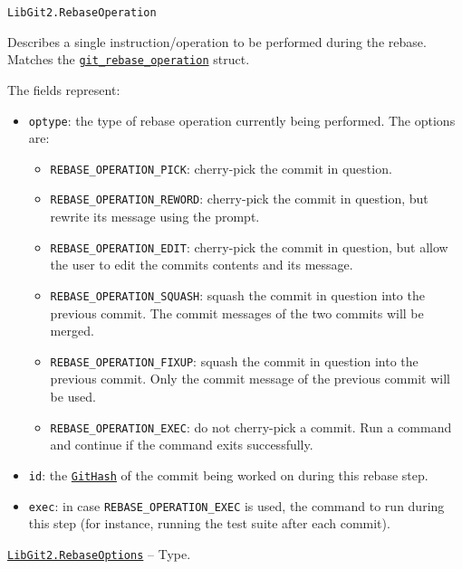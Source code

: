 \begin{adjustwidth}{2em}{0pt}


\begin{verbatim}
LibGit2.RebaseOperation
\end{verbatim}

Describes a single instruction/operation to be performed during the rebase. Matches the \href{https://libgit2.org/libgit2/\#HEAD/type/git\_rebase\_operation\_t}{\texttt{git\_rebase\_operation}} struct.

The fields represent:

\begin{itemize}
\item \texttt{optype}: the type of rebase operation currently being performed. The options are:

\begin{itemize}
\item \texttt{REBASE\_OPERATION\_PICK}: cherry-pick the commit in question.


\item \texttt{REBASE\_OPERATION\_REWORD}: cherry-pick the commit in question, but rewrite its message using the prompt.


\item \texttt{REBASE\_OPERATION\_EDIT}: cherry-pick the commit in question, but allow the user to edit the commit{\textquotesingle}s contents and its message.


\item \texttt{REBASE\_OPERATION\_SQUASH}: squash the commit in question into the previous commit. The commit messages of the two commits will be merged.


\item \texttt{REBASE\_OPERATION\_FIXUP}: squash the commit in question into the previous commit. Only the commit message of the previous commit will be used.


\item \texttt{REBASE\_OPERATION\_EXEC}: do not cherry-pick a commit. Run a command and continue if the command exits successfully.

\end{itemize}

\item \texttt{id}: the \hyperlink{202290709580230708}{\texttt{GitHash}} of the commit being worked on during this rebase step.


\item \texttt{exec}: in case \texttt{REBASE\_OPERATION\_EXEC} is used, the command to run during this step (for instance, running the test suite after each commit).

\end{itemize}


\end{adjustwidth}
\hypertarget{9347726754162781322}{}
\hyperlink{9347726754162781322}{\texttt{LibGit2.RebaseOptions}}  -- {Type.}

